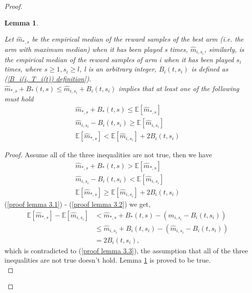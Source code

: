 \documentclass{article}
\theoremstyle{plain}
\newtheorem{lemma}{Lemma}
\begin{document}
\begin{proof}
\begin{lemma}
\label{lemma 3 normal}

Let $\hat{m}_{*, s}$ be the empirical median of the reward samples of the best arm (i.e. the arm with maximum median) when it has been played s times, $\hat{m}_{i, s_i}$, similarly, is the empirical median of the reward samples of arm i when it has been played $s_i$ times, where $s \geq 1, s_i \geq l$, l is an arbitrary integer,  $B_i(t, s_i)$ is defined as (\ref{B_i(i, T_i(t)) definition}).\\

    $\hat{m}_{*, s} + B_*(t, s)  \leq \hat{m}_{i, s_i} + B_i(t, s_i)$ implies that at least one of the following must hold
    \begin{align}
        \label{lemma 3.1}
        \hat{m}_{*, s} + B_*(t, s) \leq  \mathbb{E}[\hat{m}_{*, s}]\\
        \label{lemma 3.2}
        \hat{m}_{i, s_i} - B_i(t, s_i) \geq \mathbb{E}[\hat{m}_{i, s_i}]\\
        \label{lemma 3.3}
        \mathbb{E}[\hat{m}_{*, s}] < \mathbb{E}[\hat{m}_{i, s_i}] + 2 B_i(t, s_i)
    \end{align}
\end{lemma}

\begin{proof}
Assume all of the three inequalities are not true, then we have
    \begin{align}
        \label{proof lemma 3.1}
         \hat{m}_{*, s} + B_*(t, s) >  \mathbb{E}[\hat{m}_{*, s}]\\
        \label{proof lemma 3.2}
        \hat{m}_{i, s_i} - B_i(t, s_i) < \mathbb{E}[\hat{m}_{i, s_i}]\\
        \label{proof lemma 3.3}
        \mathbb{E}[\hat{m}_{*, s}] \geq \mathbb{E}[\hat{m}_{i, s_i}] + 2 B_i(t, s_i)
    \end{align}
    (\ref{proof lemma 3.1}) - (\ref{proof lemma 3.2}) we get, 
    \begin{align}
         \mathbb{E}[\hat{m}_{*, s}] - \mathbb{E}[\hat{m}_{i, s_i}] &< 
         \hat{m}_{*, s} + B_*(t, s) - (\hat{m}_{i, s_i} - B_i(t, s_i)) \\
        & \leq \hat{m}_{i, s_i} + B_i(t, s_i) - (\hat{m}_{i, s_i} - B_i(t, s_i)) \\
        &= 2 B_i(t, s_i),
    \end{align}
    which is contradicted to (\ref{proof lemma 3.3}), the assumption that all of the three inequalities are not true doesn't hold. Lemma \ref{lemma 3 normal} is proved to be true.\\
\end{proof}


\end{proof}
\end{document}
